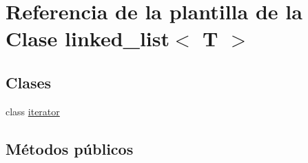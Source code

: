 \hypertarget{classlinked__list}{}\section{Referencia de la plantilla de la Clase linked\+\_\+list$<$ T $>$}
\label{classlinked__list}
\subsection*{Clases}
\begin{DoxyCompactItemize}
\item 
class \hyperlink{classlinked__list_1_1iterator}{iterator}
\end{DoxyCompactItemize}
\subsection*{Métodos públicos}
